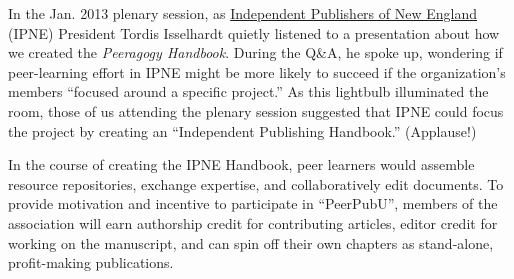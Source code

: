 In the Jan. 2013 plenary session, as \href{http://IPNE.org}{Independent
Publishers of New England} (IPNE) President Tordis Isselhardt quietly
listened to a presentation about how we created the \emph{Peeragogy
Handbook}. During the Q\&A, he spoke up, wondering if peer-learning
effort in IPNE might be more likely to succeed if the organization's
members ``focused around a specific project.'' As this lightbulb
illuminated the room, those of us attending the plenary session
suggested that IPNE could focus the project by creating an ``Independent
Publishing Handbook.'' (Applause!) 

In the course of creating the IPNE Handbook, peer learners would
assemble resource repositories, exchange expertise, and
collaboratively edit documents. To provide motivation and incentive to
participate in ``PeerPubU'', members of the association will earn
authorship credit for contributing articles, editor credit for working
on the manuscript, and can spin off their own chapters as stand-alone,
profit-making publications.
